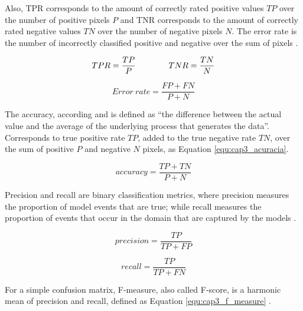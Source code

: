 Also, \ac{TPR} corresponds to the amount of correctly rated positive values $TP$ over the number of positive pixels $P$ and  
\ac{TNR} corresponds to the amount of correctly rated negative values $TN$ over the number of negative pixels $N$. 
The error rate is the number of incorrectly classified positive and negative over the sum of pixels \cite{Guo:2012}.

\begin{equation}
  \centering
  \label{equ:cap3_true_rate}
  \begin{aligned}
    TPR = \frac{TP}{P} \qquad\qquad
    TNR = \frac{TN}{N} 
  \end{aligned}
\end{equation}

\begin{equation}
  Error~rate = \frac{FP+FN}{P + N}
  \label{equ:cap3_error_rate}
\end{equation}

The accuracy, according \cite{Smith:1997:SEG:281875} and \cite{Fawcett:2006} is defined as ``the difference between the actual value and the average of the underlying process that generates the data''. 
Corresponds to true positive rate $TP$, added to the true negative rate $TN$, over the sum of positive $P$ and negative $N$ pixels, as Equation \ref{equ:cap3_acuracia}.

\begin{equation}
  accuracy = \frac{TP+TN}{P+N}
  \label{equ:cap3_acuracia}
\end{equation}

Precision and recall are binary classification metrics, where precision measures the proportion of model events that are true; while recall measures the proportion of events that occur in the domain that are captured by the models \cite{TorgoRibeiro:2009} \cite{Fawcett:2006}. 

\begin{equation}
  precision = \frac{TP}{TP+FP}
\end{equation}

\begin{equation}
  recall = \frac{TP}{TP+FN}
  \label{equ:cap3_recall}
\end{equation}

For a simple confusion matrix, F-measure, also called F-score, is a harmonic mean of precision and recall, defined as Equation \ref {equ:cap3_f_measure} \cite{Fawcett:2006}.

